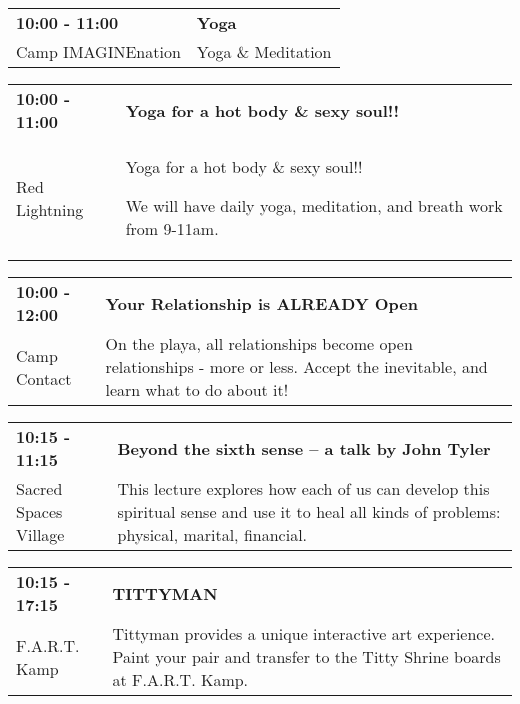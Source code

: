 \begin{tabular}{ p{1in} p{2.2in} }
    \textbf{10:00 - 11:00} & \textbf{Yoga} \\
    Camp IMAGINEnation \newline  & Yoga \& Meditation \\
    \hline 
\end{tabular}
    
\begin{tabular}{ p{1in} p{2.2in} }
    \textbf{10:00 - 11:00} & \textbf{Yoga for a hot body \& sexy soul!!} \\
    Red Lightning \newline  & Yoga for a hot body \& sexy soul!!   

We will have daily yoga, meditation, and breath work from 9-11am. \\
    \hline 
\end{tabular}
    
\begin{tabular}{ p{1in} p{2.2in} }
    \textbf{10:00 - 12:00} & \textbf{Your Relationship is ALREADY Open} \\
    Camp Contact \newline  & On the playa, all relationships become open relationships - more or less. Accept the inevitable, and learn what to do about it! \\
    \hline 
\end{tabular}
    
\begin{tabular}{ p{1in} p{2.2in} }
    \textbf{10:15 - 11:15} & \textbf{Beyond the sixth sense -- a talk by John Tyler} \\
    Sacred Spaces Village \newline  & This lecture explores how each of us can develop this spiritual sense and use it to heal all kinds of problems: physical, marital, financial. \\
    \hline 
\end{tabular}
    
\begin{tabular}{ p{1in} p{2.2in} }
    \textbf{10:15 - 17:15} & \textbf{TITTYMAN} \\
    F.A.R.T. Kamp \newline  & Tittyman provides a unique interactive art experience. Paint your pair and transfer to the Titty Shrine boards at F.A.R.T. Kamp. \\
    \hline 
\end{tabular}
    
